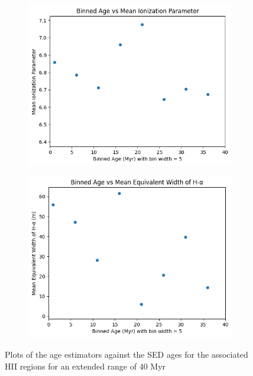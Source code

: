 \documentclass[12pt]{report}
\begin{document}
\begin{figure}[htbp]
    \centering

    \begin{subfigure}{0.4\textwidth}
        \centering
        \includegraphics[width=\linewidth]{image18.png}
        \label{fig:image18}
    \end{subfigure}
    \hfill
    \begin{subfigure}{0.4\textwidth}
        \centering
        \includegraphics[width=\linewidth]{image19.png}
        \label{fig:image19}
    \end{subfigure}

    \small
    \caption{Plots of the age estimators against the SED ages for the associated HII regions for an extended range of 40 Myr}
    \label{fig: image18_19}
\end{figure}
\end{document}
